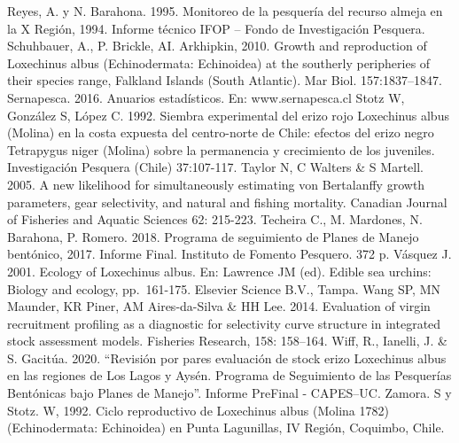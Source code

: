 \documentclass[
]{article}
\begin{document}
Reyes, A. y N. Barahona. 1995. Monitoreo de la pesquería del recurso
almeja en la X Región, 1994. Informe técnico IFOP -- Fondo de
Investigación Pesquera. Schuhbauer, A., P. Brickle, AI. Arkhipkin, 2010.
Growth and reproduction of Loxechinus albus (Echinodermata: Echinoidea)
at the southerly peripheries of their species range, Falkland Islands
(South Atlantic). Mar Biol. 157:1837--1847. Sernapesca. 2016. Anuarios
estadísticos. En: www.sernapesca.cl Stotz W, González S, López C. 1992.
Siembra experimental del erizo rojo Loxechinus albus (Molina) en la
costa expuesta del centro-norte de Chile: efectos del erizo negro
Tetrapygus niger (Molina) sobre la permanencia y crecimiento de los
juveniles. Investigación Pesquera (Chile) 37:107-117. Taylor N, C
Walters \& S Martell. 2005. A new likelihood for simultaneously
estimating von Bertalanffy growth parameters, gear selectivity, and
natural and fishing mortality. Canadian Journal of Fisheries and Aquatic
Sciences 62: 215-223. Techeira C., M. Mardones, N. Barahona, P. Romero.
2018. Programa de seguimiento de Planes de Manejo bentónico, 2017.
Informe Final. Instituto de Fomento Pesquero. 372 p. Vásquez J. 2001.
Ecology of Loxechinus albus. En: Lawrence JM (ed). Edible sea urchins:
Biology and ecology, pp.~161-175. Elsevier Science B.V., Tampa. Wang SP,
MN Maunder, KR Piner, AM Aires-da-Silva \& HH Lee. 2014. Evaluation of
virgin recruitment profiling as a diagnostic for selectivity curve
structure in integrated stock assessment models. Fisheries Research,
158: 158--164. Wiff, R., Ianelli, J. \& S. Gacitúa. 2020. ``Revisión por
pares evaluación de stock erizo Loxechinus albus en las regiones de Los
Lagos y Aysén. Programa de Seguimiento de las Pesquerías Bentónicas bajo
Planes de Manejo''. Informe PreFinal - CAPES--UC. Zamora. S y Stotz. W,
1992. Ciclo reproductivo de Loxechinus albus (Molina 1782)
(Echinodermata: Echinoidea) en Punta Lagunillas, IV Región, Coquimbo,
Chile.
\end{document}

